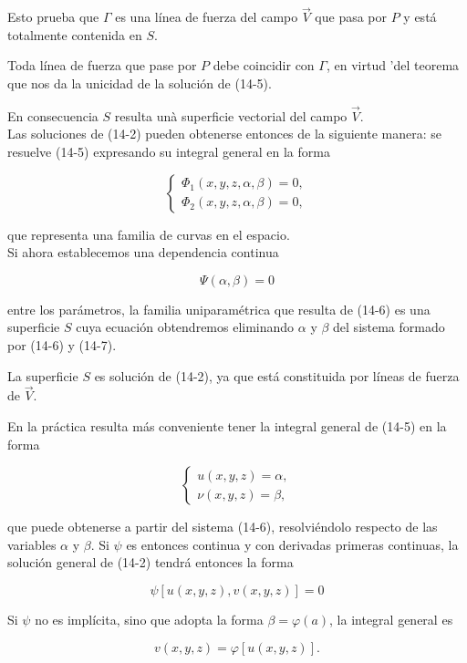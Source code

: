 \documentclass[10pt]{article}
\theoremstyle{plain}
\theoremstyle{definition}
\theoremstyle{remark}
\begin{document}
Esto prueba que $\Gamma$ es una línea de fuerza del campo $\vec{V}$ que pasa por $P$ y está totalmente contenida en $S$.

Toda línea de fuerza que pase por $P$ debe coincidir con $\Gamma$, en virtud 'del teorema que nos da la unicidad de la solución de (14-5).

En consecuencia $S$ resulta unà superficie vectorial del campo $\vec{V}$.\\
Las soluciones de (14-2) pueden obtenerse entonces de la siguiente manera: se resuelve (14-5) expresando su integral general en la forma

\[
\left\{\begin{array}{l}
\Phi_{1}(x, y, z, \alpha, \beta)=0,  \tag{14-6}\\
\Phi_{2}(x, y, z, \alpha, \beta)=0,
\end{array}\right.
\]

que representa una familia de curvas en el espacio.\\
Si ahora establecemos una dependencia continua


\begin{equation*}
\Psi(\alpha, \beta)=0 \tag{14-7}
\end{equation*}


entre los parámetros, la familia uniparamétrica que resulta de (14-6) es una superficie $S$ cuya ecuación obtendremos eliminando $\alpha$ y $\beta$ del sistema formado por (14-6) y (14-7).

La superficie $S$ es solución de (14-2), ya que está constituida por líneas de fuerza de $\vec{V}$.

En la práctica resulta más conveniente tener la integral general de (14-5) en la forma

$$
\left\{\begin{array}{l}
u(x, y, z)=\alpha, \\
\nu(x, y, z)=\beta,
\end{array}\right.
$$

que puede obtenerse a partir del sistema (14-6), resolviéndolo respecto de las variables $\alpha$ y $\beta$. Si $\psi$ es entonces continua y con derivadas primeras continuas, la solución general de (14-2) tendrá entonces la forma

$$
\psi[u(x, y, z), v(x, y, z)]=0
$$

Si $\psi$ no es implícita, sino que adopta la forma $\beta=\varphi(a)$, la integral general es

$$
v(x, y, z)=\varphi[u(x, y, z)] .
$$
\end{document}
